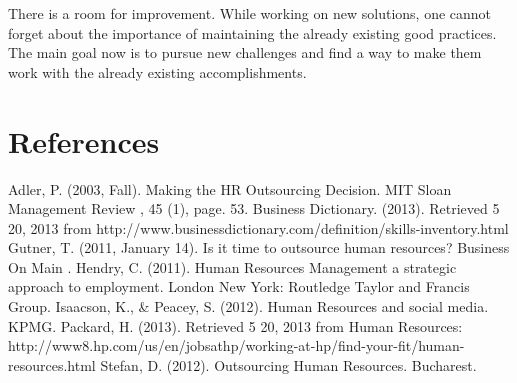 \documentclass[a4paper,fleqn,11pt,dvips,titlepage]{article}
\numberwithin{figure}{section}
\numberwithin{equation}{section}
\begin{document}
There is a room for improvement. While working on new solutions, one cannot forget about the importance of maintaining the already existing good practices. The main goal now is to pursue new challenges and find a way to make them work with the already existing accomplishments. 

























\section{References}
Adler, P. (2003, Fall). Making the HR Outsourcing Decision. MIT Sloan Management Review , 45 (1), page. 53.
Business Dictionary. (2013). Retrieved 5 20, 2013 from http://www.businessdictionary.com/definition/skills-inventory.html
Gutner, T. (2011, January 14). Is it time to outsource human resources? Business On Main .
Hendry, C. (2011). Human Resources Management a strategic approach to employment. London New York: Routledge Taylor and Francis Group.
Isaacson, K., \& Peacey, S. (2012). Human Resources and social media. KPMG.
Packard, H. (2013). Retrieved 5 20, 2013 from Human Resources: http://www8.hp.com/us/en/jobsathp/working-at-hp/find-your-fit/human-resources.html
Stefan, D. (2012). Outsourcing Human Resources. Bucharest.






\end{document}
